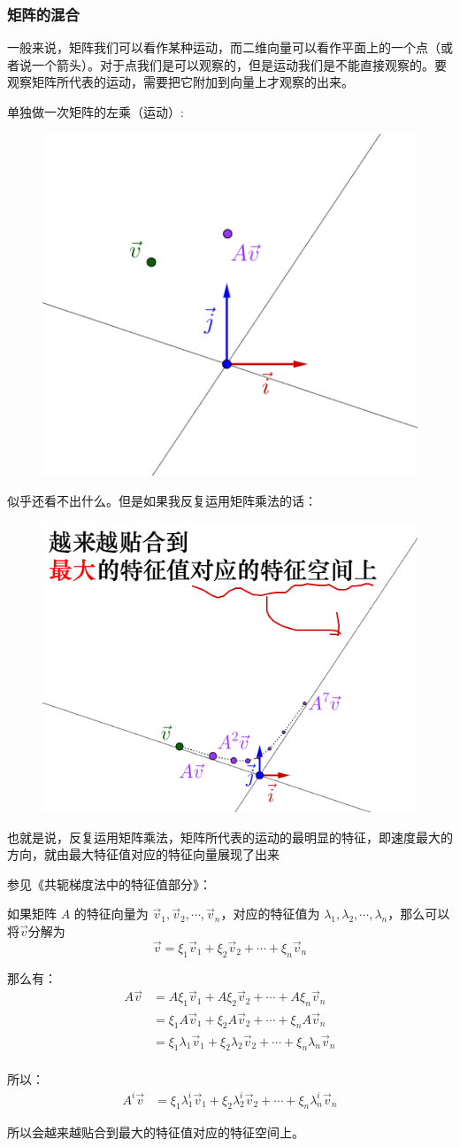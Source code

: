 \documentclass[12pt]{article}
\begin{document}
\subsubsection{矩阵的混合}
一般来说，矩阵我们可以看作某种运动，而二维向量可以看作平面上的一个点（或者说一个箭头）。对于点我们是可以观察的，但是运动我们是不能直接观察的。要观察矩阵所代表的运动，需要把它附加到向量上才观察的出来。

单独做一次矩阵的左乘（运动）:
\begin{figure}[H]
    \centering
    \includegraphics[width=.3\textwidth]{fig/UnderstandEigenValueVector_7.png}
\end{figure} 

似乎还看不出什么。但是如果我反复运用矩阵乘法的话：
\begin{figure}[H]
    \centering
    \includegraphics[width=.5\textwidth]{fig/UnderstandEigenValueVector_8.png}
\end{figure} 

也就是说，反复运用矩阵乘法，矩阵所代表的运动的最明显的特征，即速度最大的方向，就由最大特征值对应的特征向量展现了出来

\begin{framed}
参见《共轭梯度法中的特征值部分》：

如果矩阵 $A$ 的特征向量为 $\vec{v}_1, \vec{v}_2, \cdots, \vec{v}_n$，对应的特征值为 $\lambda_1, \lambda_2, \cdots, \lambda_n$，那么可以将$\vec{v}$分解为 
$$
\vec{v} = \xi_1\vec{v}_1 + \xi_2\vec{v}_2 + \cdots + \xi_n\vec{v}_n
$$

那么有：
\begin{align*}
A\vec{v} &= A\xi_1\vec{v}_1 + A\xi_2\vec{v}_2 + \cdots + A\xi_n\vec{v}_n \\
	&= \xi_1A\vec{v}_1 + \xi_2A\vec{v}_2 + \cdots + \xi_nA\vec{v}_n \\
	&= \xi_1\lambda_1\vec{v}_1 + \xi_2\lambda_2\vec{v}_2 + \cdots + \xi_n\lambda_n\vec{v}_n \\
\end{align*}

所以：
\begin{align*}
A^i\vec{v} &= \xi_1\lambda_1^i\vec{v}_1 + \xi_2\lambda_2^i\vec{v}_2 + \cdots + \xi_n\lambda_n^i\vec{v}_n
\end{align*}

所以会越来越贴合到最大的特征值对应的特征空间上。
\end{framed}
\end{document}
